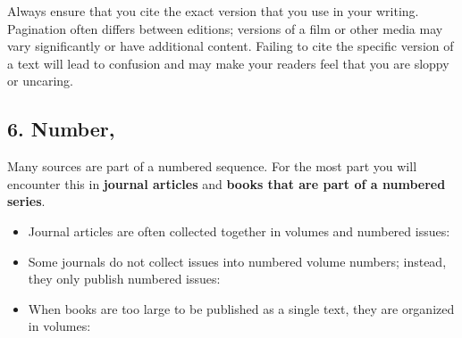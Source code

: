  \bigskip

 \bigskip

\bigskip

\noindent Always ensure that you cite the exact version that you use in your writing. Pagination often differs between editions; versions of a film or other media may vary significantly or have additional content. Failing to cite the specific version of a text will lead to confusion and may make your readers feel that you are sloppy or uncaring. 

\subsection{6. Number,}

Many sources are part of a numbered sequence. For the most part you will encounter this in \textbf{journal articles} and \textbf{books that are part of a numbered series}.
 
\bigskip

\begin{itemize}
\item Journal articles are often collected together in volumes and numbered issues: 
\end{itemize}

\medskip

\begin{itemize}
\item Some journals do not collect issues into numbered volume numbers; instead, they only publish numbered issues:\end{itemize}

\medskip

\begin{itemize}
\item When books are too large to be published as a single text, they are organized in volumes: 
\end{itemize}

